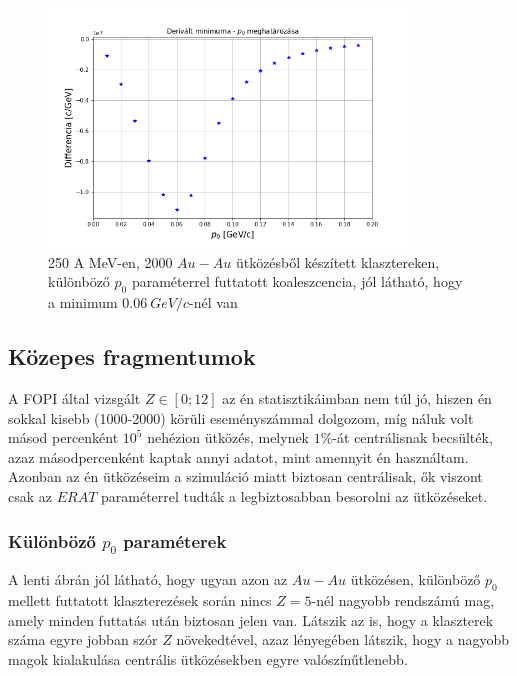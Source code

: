 \documentclass[a4paper,12pt]{article}
\begin{document}
\vspace{5mm}

\begin{figure}[H]
\centering
\includegraphics[width=0.85\textwidth]{./legjobb_p0.png}
\caption{250 A MeV-en, 2000 $Au-Au$ ütközésből készített klasztereken, különböző $p_{0}$ paraméterrel futtatott koaleszcencia, jól látható, hogy a minimum $0.06 ~GeV/c$-nél van}
\end{figure}

\subsection{ Közepes fragmentumok}

\vspace{5mm}

\par A FOPI által vizsgált $Z \in [0;12]$ az én statisztikáimban nem túl jó, hiszen én sokkal kisebb (1000-2000) körüli eseményszámmal dolgozom, míg náluk volt másod percenként $10^{5}$ nehézion ütközés, melynek $1\%$-át centrálisnak becsülték, azaz másodpercenként kaptak annyi adatot, mint amennyit én használtam. Azonban az én ütközéseim a szimuláció miatt biztosan centrálisak, ők viszont csak az $ERAT$ paraméterrel tudták a legbiztosabban besorolni az ütközéseket.

\vspace{5mm}

\subsubsection{ Különböző $p_{0}$ paraméterek}

\vspace{5mm}

\par A lenti ábrán jól látható, hogy ugyan azon az $Au-Au$ ütközésen, különböző $p_{0}$ mellett futtatott klaszterezések során nincs $Z = 5$-nél nagyobb rendszámú mag, amely minden futtatás után biztosan jelen van. Látszik az is, hogy a klaszterek száma egyre jobban szór $Z$ növekedtével, azaz lényegében látszik, hogy a nagyobb magok kialakulása centrális ütközésekben egyre valószínűtlenebb.
\end{document}

